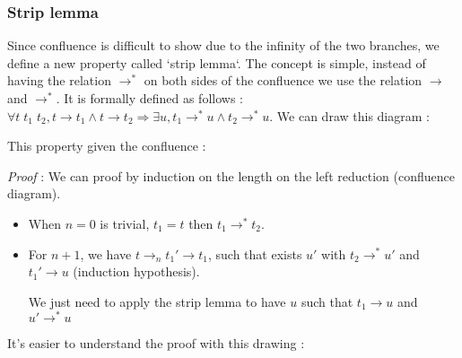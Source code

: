   \subsubsection{Strip lemma}

  Since confluence is difficult to show due to the infinity of the two branches,
  we define a new property called `strip lemma`. The concept is simple, instead
  of having the relation $\to^*$ on both sides of the confluence we use the
  relation $\to$ and $\to^*$. It is formally defined as follows : $\forall
  t\;t_1\;t_2, t \to t_1 \wedge t \to t_2 \Rightarrow \exists u, t_1 \to^* u
  \wedge t_2 \to^* u$. We can draw this diagram :

  \begin{center}
  \end{center}

  This property given the confluence :

  \textit{Proof} : We can proof by induction on the length on the left reduction
  (confluence diagram).

  \begin{itemize}
    \item When $n = 0$ is trivial, $t_1 = t$ then $t_1 \to^* t_2$.
    \item For $n + 1$, we have $t \to_{n} t_1' \to t_1$, such that exists $u'$
      with $t_2 \to^* u'$ and $t_1' \to u$ (induction hypothesis).

      We just need to apply the strip lemma to have $u$ such that $t_1 \to u$
      and $u' \to^* u$
  \end{itemize}

  It's easier to understand the proof with this drawing :

  \begin{center}
  \end{center}
  \qedsymbol

